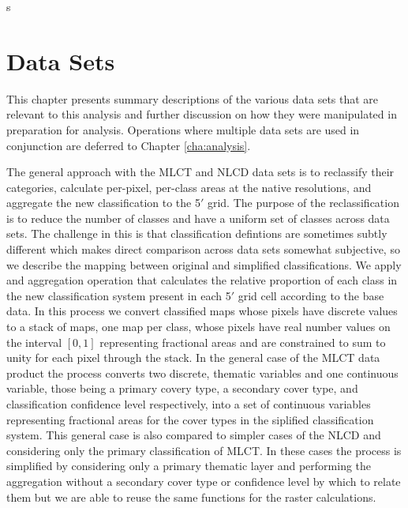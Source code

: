 s%








\graphicspath{ {datasets/} }


\chapter{Data Sets}
\label{cha:datasets}

This chapter presents summary descriptions of the various data sets
that are relevant to this analysis and further discussion on how they
were manipulated in preparation for analysis.  Operations where
multiple data sets are used in conjunction are deferred to Chapter
\ref{cha:analysis}.

The general approach with the MLCT and NLCD data sets is to reclassify
their categories, calculate per-pixel, per-class areas at the native
resolutions, and aggregate the new classification to the 5$'$ grid.
The purpose of the reclassification is to reduce the number of classes
and have a uniform set of classes across data sets.  The challenge in
this is that classification defintions are sometimes subtly different
which makes direct comparison across data sets somewhat subjective, so
we describe the mapping between original and simplified
classifications.  We apply and aggregation operation that calculates
the relative proportion of each class in the new classification system
present in each 5$'$ grid cell according to the base data.  In this
process we convert classified maps whose pixels have discrete values
to a stack of maps, one map per class, whose pixels have real number
values on the interval $[0,1]$ representing fractional areas and are
constrained to sum to unity for each pixel through the stack.  In the
general case of the MLCT data product the process converts two
discrete, thematic variables and one continuous variable, those being
a primary covery type, a secondary cover type, and classification
confidence level respectively, into a set of continuous variables
representing fractional areas for the cover types in the siplified
classification system.  This general case is also compared to simpler
cases of the NLCD and considering only the primary classification of
MLCT.  In these cases the process is simplified by considering only a
primary thematic layer and performing the aggregation without a
secondary cover type or confidence level by which to relate them but
we are able to reuse the same functions for the raster calculations.

